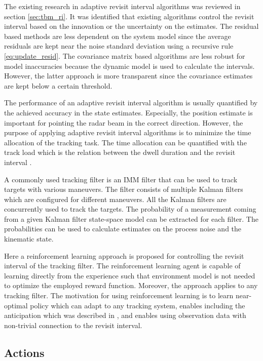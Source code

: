 \documentclass[11pt,a4paper]{article}
\begin{document}
The existing research in adaptive revisit interval algorithms was reviewed in section \ref{sec:tbm_ri}.
It was identified that existing algorithms control the revisit interval based on the innovation or the uncertainty on the estimates.
The residual based methods are less dependent on the system model since the average residuals are kept near the noise standard deviation using a recursive rule \eqref{eq:update_resid}.
The covariance matrix based algorithms are less robust for model inaccuracies because the dynamic model is used to calculate the intervals.
However, the latter approach is more transparent since the covariance estimates are kept below a certain threshold.

The performance of an adaptive revisit interval algorithm is usually quantified by the achieved accuracy in the state estimates.
Especially, the position estimate is important for pointing the radar beam in the correct direction.
However, the purpose of applying adaptive revisit interval algorithms is to minimize the time allocation of the tracking task.
The time allocation can be quantified with the track load which is the relation between the dwell duration and the revisit interval \cite{vanKeuk1993}.

A commonly used tracking filter is an IMM filter that can be used to track targets with various maneuvers.
The filter consists of multiple Kalman filters which are configured for different maneuvers.
All the Kalman filters are concurrently used to track the targets.
The probability of a measurement coming from a given Kalman filter state-space model can be extracted for each filter.
The probabilities can be used to calculate estimates on the process noise and the kinematic state.

Here a reinforcement learning approach is proposed for controlling the revisit interval of the tracking filter.
The reinforcement learning agent is capable of learning directly from the experience such that 
environment model is not needed to optimize the employed reward function.
Moreover, the approach applies to any tracking filter.
The motivation for using reinforcement learning is to learn near-optimal policy which can adapt to any tracking system, enables including the anticipation which was described in \cite{Charlish2015}, and enables using observation data with non-trivial connection to the revisit interval.

\subsection{Actions}
\end{document}
